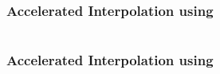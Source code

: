 \begin{frame}[t]
	\frametitle{Accelerated Interpolation using \qvasr}
	\begin{columns}
		\begin{column}{0.35\textwidth}
			\resizebox{0.8\textwidth}{!}{}
		\end{column}
		\begin{column}{0.55\textwidth}
			\resizebox{0.77\textwidth}{!}{}
		\end{column}
	\end{columns}
\end{frame}

\begin{frame}[t]
	\frametitle{Accelerated Interpolation using \qvasr}
	\begin{columns}
		\begin{column}{0.35\textwidth}
			\resizebox{0.8\textwidth}{!}{}
		\end{column}
		\begin{column}{0.55\textwidth}
			\resizebox{0.4\textwidth}{!}{}
		\end{column}
	\end{columns}
\end{frame}